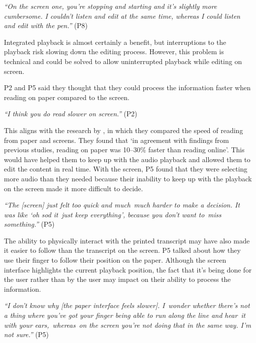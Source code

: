 \textit{``On the screen one, you're stopping and starting and it's slightly more cumbersome. I couldn't listen and edit
at the same time, whereas I could listen and edit with the pen.''} (P8)

Integrated playback is almost certainly a benefit, but interruptions to the playback risk slowing down the editing
process. However, this problem is technical and could be solved to allow uninterrupted playback while editing on screen.


P2 and P5 said they thought that they could process the information faster when reading on paper compared to the
screen.

\textit{``I think you do read slower on screen.''} (P2)

This aligns with the research by \cite{Kurniawan2001}, in which they compared the speed of reading from paper and
screens. They found that `in agreement with findings from previous studies, reading on paper was 10--30\% faster than
reading online'.  This would have helped them to keep up with the audio playback and allowed them to edit the content
in real time. With the screen, P5 found that they were selecting more audio than they needed because their inability to
keep up with the playback on the screen made it more difficult to decide.

\textit{``The [screen] just felt too quick and much much harder to make a decision. It was like `oh sod it just keep
everything', because you don't want to miss something.''} (P5)

The ability to physically interact with the printed transcript may have also made it easier to follow than the
transcript on the screen. P5 talked about how they use their finger to follow their position on the paper. Although the
screen interface highlights the current playback position, the fact that it's being done for the user rather than by
the user may impact on their ability to process the information.

\textit{``I don't know why [the paper interface feels slower]. I wonder whether there's not a thing where
  you've got your finger being able to run along the line and hear it with your ears, whereas on the screen you're not
doing that in the same way. I'm not sure.''} (P5) 

